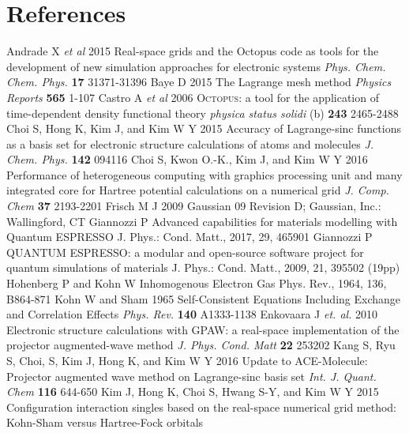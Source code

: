 \section*{References}

\begin{thebibliography}{9}
%
 Andrade X \textit{et al} 2015
Real-space grids and the Octopus code as tools for the development
of new simulation approaches for electronic systems
\textit{Phys. Chem. Chem. Phys.} \textbf{17} 31371-31396
%
 Baye D 2015
The Lagrange mesh method
\textit{Physics Reports} \textbf{565} 1-107
%
 Castro A \textit{et al} 2006
\textsc{Octopus}: a tool for the application of time-dependent density functional theory
\textit{physica status solidi} (b) \textbf{243} 2465-2488
%
 Choi S, Hong K, Kim J, and Kim W Y 2015
Accuracy of Lagrange-sinc functions as a basis set for electronic structure
calculations of atoms and molecules
\textit{J. Chem. Phys.} \textbf{142} 094116
%
 Choi S,  Kwon O.-K., Kim J, and Kim W Y 2016
Performance of heterogeneous computing with graphics processing unit
and many integrated core for Hartree potential calculations on a numerical grid
\textit{J. Comp. Chem} \textbf{37} 2193-2201
%
 Frisch M J 2009
Gaussian 09 Revision D; Gaussian, Inc.: Wallingford, CT
%
 Giannozzi P
Advanced capabilities for materials modelling with Quantum ESPRESSO
J. Phys.: Cond. Matt., 2017, 29, 465901
%
 Giannozzi P
QUANTUM ESPRESSO: a modular and open-source software project for
quantum simulations of materials J. Phys.: Cond. Matt., 2009, 21, 395502 (19pp)
%
%
 Hohenberg P and Kohn W
Inhomogenous Electron Gas Phys. Rev., 1964, 136, B864-871
%
 Kohn W and Sham 1965
Self-Consistent Equations Including Exchange and Correlation Effects
\textit{Phys. Rev.} \textbf{140} A1333-1138
%
 Enkovaara J \textit{et. al.} 2010
Electronic structure calculations with GPAW:
a real-space implementation of the projector augmented-wave method
\textit{J. Phys. Cond. Matt} \textbf{22} 253202
%
 Kang S, Ryu S, Choi, S, Kim J, Hong K, and Kim W Y 2016
Update to ACE-Molecule: Projector augmented wave method on Lagrange-sinc basis set
\textit{Int. J. Quant. Chem} \textbf{116} 644-650
%
 Kim J, Hong K, Choi S, Hwang S-Y, and Kim W Y 2015
Configuration interaction singles based on the real-space numerical grid method:
Kohn-Sham versus Hartree-Fock orbitals

\end{thebibliography}
